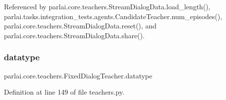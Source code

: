 Referenced by parlai.\+core.\+teachers.\+Stream\+Dialog\+Data.\+load\+\_\+length(), parlai.\+tasks.\+integration\+\_\+tests.\+agents.\+Candidate\+Teacher.\+num\+\_\+episodes(), parlai.\+core.\+teachers.\+Stream\+Dialog\+Data.\+reset(), and parlai.\+core.\+teachers.\+Stream\+Dialog\+Data.\+share().

\mbox{\label{classparlai_1_1core_1_1teachers_1_1FixedDialogTeacher_a65c9039b783299ad6033ccbb995ca493}} 
\subsubsection{\texorpdfstring{datatype}{datatype}}
{\footnotesize\ttfamily parlai.\+core.\+teachers.\+Fixed\+Dialog\+Teacher.\+datatype}



Definition at line 149 of file teachers.\+py.



